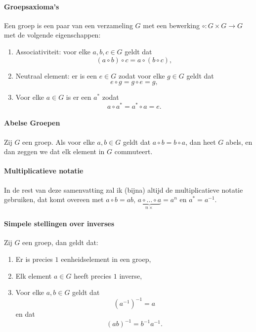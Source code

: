 \paragraph{Groepsaxioma's} Een groep is een paar van een verzameling \(G\) met een bewerking \(\circ\colon G\times G\to G\) met de volgende eigenschappen:
\begin{enumerate}
    \item Associativiteit: voor elke \(a,b,c\in G\) geldt dat
          \[
              (a\circ b)\circ c=a\circ(b\circ c),
          \]
    \item Neutraal element: er is een \(e\in G\) zodat voor elke \(g\in G\) geldt dat
          \[
              e\circ g=g\circ e=g,
          \]
    \item Voor elke \(a\in G\) is er een \(a^{*}\) zodat
          \[
              a\circ a^{*}=a^{*}\circ a=e.
          \]
\end{enumerate}

\paragraph{Abelse Groepen} Zij \(G\) een groep. Als voor elke \(a,b\in G\) geldt dat \(a\circ b=b\circ a\), dan heet \(G\) abels, en dan zeggen we dat elk element in \(G\) commuteert.

\paragraph{Multiplicatieve notatie} In de rest van deze samenvatting zal ik (bijna) altijd de multiplicatieve notatie gebruiken, dat komt overeen met \(a\circ b=ab\), \(\underbrace{a\circ\dots\circ a}_{n\times}=a^{n}\) en \(a^{*}=a^{-1}\).

\paragraph{Simpele stellingen over inverses} Zij \(G\) een groep, dan geldt dat:
\begin{enumerate}
    \item Er is precies \(1\) eenheidselement in een groep,
    \item Elk element \(a\in G\) heeft precies \(1\) inverse,
    \item Voor elke \(a,b\in G\) geldt dat
          \[
              \left(a^{-1}\right)^{-1}=a
          \]
          en dat
          \[
              (ab)^{-1}=b^{-1}a^{-1}.
          \]
\end{enumerate}

